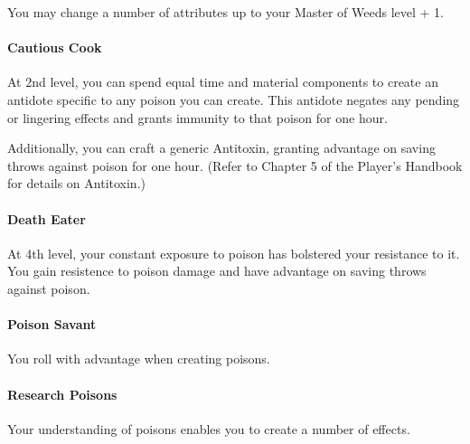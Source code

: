 \documentclass{report}
\begin{document}
  You may change a number of attributes up to your Master of Weeds level + 1.
  
  

\paragraph*{Cautious Cook}
At 2nd level, you can spend equal time and material components to create an antidote specific to any poison you can create.
This antidote negates any pending or lingering effects and grants immunity to that poison for one hour.

Additionally, you can craft a generic Antitoxin, granting advantage on saving throws against poison for one hour.  (Refer to Chapter 5 of the Player's Handbook for details on Antitoxin.)

\paragraph*{Death Eater}
At 4th level, your constant exposure to poison has bolstered your resistance to it.
You gain resistence to poison damage and have advantage on saving throws against poison.

\paragraph*{Poison Savant}
You roll with advantage when creating poisons.










\paragraph*{Research Poisons}
Your understanding of poisons enables you to create a number of effects.
\end{document}
